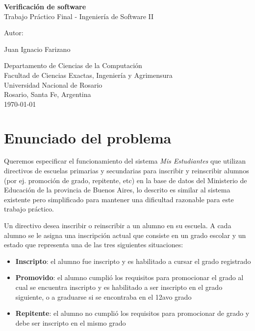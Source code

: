 \documentclass{article}
\begin{document}
\begin{titlepage}
  \thispagestyle{empty}
  \begin{center}
    
    {\huge \textbf{Verificación de software} \\[0.4cm]}
    {\large Trabajo Práctico Final - Ingeniería de Software II} \\
    \noindent
    
    \vfill
    \vfill
    \vfill
    {\Large Autor: \par}
    {\Large Juan Ignacio Farizano\par}
  
    \vfill
    Departamento de Ciencias de la Computaci\'on\\
    Facultad de Ciencias Exactas, Ingenier\'ia y Agrimensura\\
    Universidad Nacional de Rosario \\
    Rosario, Santa Fe, Argentina\\[0.4cm]
    {\large \today} 
  \end{center}
\end{titlepage}

\section{Enunciado del problema}
Queremos especificar el funcionamiento del sistema \emph{Mis Estudiantes} que utilizan directivos de escuelas primarias y secundarias para inscribir y reinscribir alumnos (por ej. promoción de grado, repitente, etc) en la base de datos del Ministerio de Educación de la provincia de Buenos Aires, lo descrito es similar al sistema existente pero simplificado para mantener una dificultad razonable para este trabajo práctico.

Un directivo desea inscribir o reinscribir a un alumno en su escuela. A cada alumno se le asigna una inscripción actual que consiste en un grado escolar y un estado que representa una de las tres siguientes situaciones:

\begin{itemize}
  \item \textbf{Inscripto}: el alumno fue inscripto y es habilitado a cursar el grado registrado
  \item \textbf{Promovido}: el alumno cumplió los requisitos para promocionar el grado al cual se encuentra inscripto y es habilitado a ser inscripto en el grado siguiente, o a graduarse si se encontraba en el 12avo grado
  \item \textbf{Repitente}: el alumno no cumplió los requisitos para promocionar de grado y debe ser inscripto en el mismo grado
\end{itemize}
\end{document}
